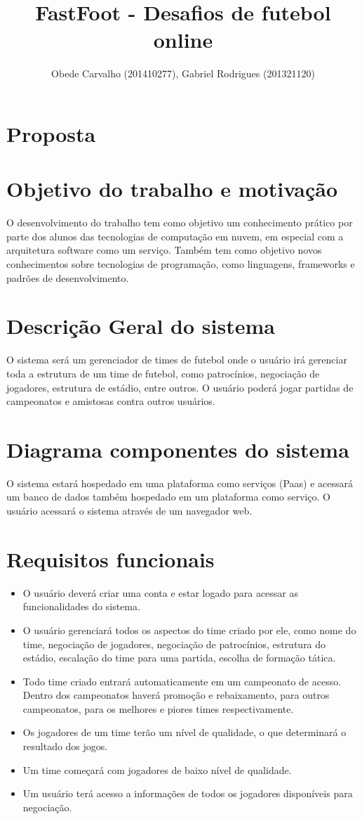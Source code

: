 \documentclass[11pt,a4paper]{article}
\title{FastFoot - Desafios de futebol online}
\author{Obede Carvalho (201410277), Gabriel Rodrigues (201321120)}
\date{}
\begin{document}
	\maketitle
	\section{Proposta}
	\section*{Objetivo do trabalho e motivação}
		O desenvolvimento do trabalho tem como objetivo um conhecimento prático por parte dos alunos das tecnologias de computação em nuvem, em especial com a arquitetura software como um serviço. Também tem como objetivo novos conhecimentos sobre tecnologias de programação, como linguagens, frameworks e padrões de desenvolvimento.

	\section*{Descrição Geral do sistema}
		O sistema será um gerenciador de times de futebol onde o usuário irá gerenciar toda a estrutura de um time de futebol, como patrocínios, negociação de jogadores, estrutura de estádio, entre outros. O usuário poderá jogar partidas de campeonatos e amistosas contra outros usuários.

	\section*{Diagrama componentes do sistema}
		O sistema estará hospedado em uma plataforma como serviços (Paas) e acessará um banco de dados também hospedado em um plataforma como serviço. O usuário acessará o sistema através de um navegador web.

	\section*{Requisitos funcionais}
		\begin{itemize}
			\item O usuário deverá criar uma conta e estar logado para acessar as funcionalidades do sistema.
			\item O usuário gerenciará todos os aspectos do time criado por ele, como nome do time, negociação de jogadores, negociação de patrocínios, estrutura do estádio, escalação do time para uma partida, escolha de formação tática.
			\item Todo time criado entrará automaticamente em um campeonato de acesso. Dentro dos campeonatos haverá promoção e rebaixamento, para outros campeonatos, para os melhores e piores times respectivamente.
			\item Os jogadores de um time terão um nível de qualidade, o que determinará o resultado dos jogos.
			\item Um time começará com jogadores de baixo nível de qualidade.
			\item Um usuário terá acesso a informações de todos os jogadores disponíveis para negociação.	
		\end{itemize}
\end{document}

